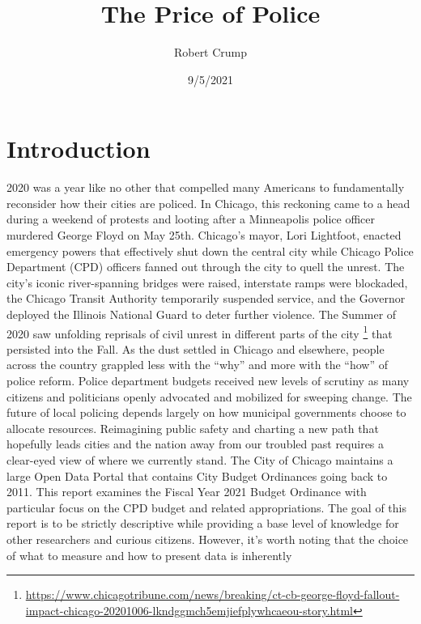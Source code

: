 \documentclass[
]{article}
\title{The Price of Police}
\author{Robert Crump}
\date{9/5/2021}
\begin{document}
\maketitle

\hypertarget{introduction}{%
\section{Introduction}\label{introduction}}

\setlength{\parindent}{5ex}

2020 was a year like no other that compelled many Americans to
fundamentally reconsider how their cities are policed. In Chicago, this
reckoning came to a head during a weekend of protests and looting after
a Minneapolis police officer murdered George Floyd on May 25th.
Chicago's mayor, Lori Lightfoot, enacted emergency powers that
effectively shut down the central city while Chicago Police Department
(CPD) officers fanned out through the city to quell the unrest. The
city's iconic river-spanning bridges were raised, interstate ramps were
blockaded, the Chicago Transit Authority temporarily suspended service,
and the Governor deployed the Illinois National Guard to deter further
violence. The Summer of 2020 saw unfolding reprisals of civil unrest in
different parts of the city \footnote{\url{https://www.chicagotribune.com/news/breaking/ct-cb-george-floyd-fallout-impact-chicago-20201006-lkndggmch5emjiefplywhcaeou-story.html}}
that persisted into the Fall. As the dust settled in Chicago and
elsewhere, people across the country grappled less with the ``why'' and
more with the ``how'' of police reform. Police department budgets
received new levels of scrutiny as many citizens and politicians openly
advocated and mobilized for sweeping change. \setlength{\parindent}{5ex}
The future of local policing depends largely on how municipal
governments choose to allocate resources. Reimagining public safety and
charting a new path that hopefully leads cities and the nation away from
our troubled past requires a clear-eyed view of where we currently
stand. The City of Chicago maintains a large Open Data Portal that
contains City Budget Ordinances going back to 2011. This report examines
the Fiscal Year 2021 Budget Ordinance with particular focus on the CPD
budget and related appropriations. The goal of this report is to be
strictly descriptive while providing a base level of knowledge for other
researchers and curious citizens. However, it's worth noting that the
choice of what to measure and how to present data is inherently
\end{document}
